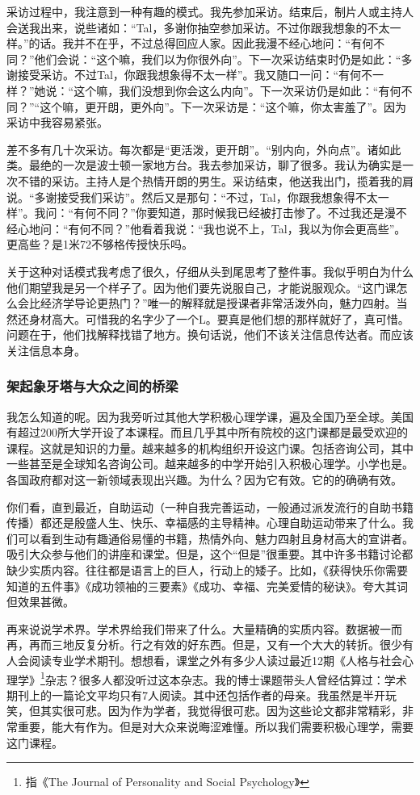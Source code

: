 采访过程中，我注意到一种有趣的模式。我先参加采访。结束后，制片人或主持人会送我出来，说些诸如：“Tal，多谢你抽空参加采访。不过你跟我想象的不太一样。”的话。我并不在乎，不过总得回应人家。因此我漫不经心地问：“有何不同？”他们会说：“这个嘛，我们以为你很外向”。下一次采访结束时仍是如此：“多谢接受采访。不过Tal，你跟我想象得不太一样”。我又随口一问：“有何不一样？”她说：“这个嘛，我们没想到你会这么内向”。下一次采访仍是如此：“有何不同？”“这个嘛，更开朗，更外向”。下一次采访是：“这个嘛，你太害羞了”。因为采访中我容易紧张。

差不多有几十次采访。每次都是“更活泼，更开朗”。“别内向，外向点”。诸如此类。最绝的一次是波士顿一家地方台。我去参加采访，聊了很多。我认为确实是一次不错的采访。主持人是个热情开朗的男生。采访结束，他送我出门，揽着我的肩说。“多谢接受我们采访”。然后又是那句：“不过，Tal，你跟我想象得不太一样”。我问：“有何不同？”你要知道，那时候我已经被打击惨了。不过我还是漫不经心地问：“有何不同？”他看着我说：“我也说不上，Tal，我以为你会更高些”。更高些？是1米72不够格传授快乐吗。

关于这种对话模式我考虑了很久，仔细从头到尾思考了整件事。我似乎明白为什么他们期望我是另一个样子了。因为他们要先说服自己，才能说服观众。“这门课怎么会比经济学导论更热门？”唯一的解释就是授课者非常活泼外向，魅力四射。当然还身材高大。可惜我的名字少了一个L。要真是他们想的那样就好了，真可惜。问题在于，他们找解释找错了地方。换句话说，他们不该关注信息传达者。而应该关注信息本身。

\subsubsection{架起象牙塔与大众之间的桥梁}
我怎么知道的呢。因为我旁听过其他大学积极心理学课，遍及全国乃至全球。美国有超过200所大学开设了本课程。而且几乎其中所有院校的这门课都是最受欢迎的课程。这就是知识的力量。越来越多的机构组织开设这门课。包括咨询公司，其中一些甚至是全球知名咨询公司。越来越多的中学开始引入积极心理学。小学也是。各国政府都对这一新领域表现出兴趣。为什么？因为它有效。它的的确确有效。

你们看，直到最近，自助运动（一种自我完善运动，一般通过派发流行的自助书籍传播）都还是殷盛人生、快乐、幸福感的主导精神。心理自助运动带来了什么。我们可以看到生动有趣通俗易懂的书籍，热情外向、魅力四射且身材高大的宣讲者。吸引大众参与他们的讲座和课堂。但是，这个“但是”很重要。其中许多书籍讨论都缺少实质内容。往往都是语言上的巨人，行动上的矮子。比如，《获得快乐你需要知道的五件事》《成功领袖的三要素》《成功、幸福、完美爱情的秘诀》。夸大其词但效果甚微。

再来说说学术界。学术界给我们带来了什么。大量精确的实质内容。数据被一而再，再而三地反复分析。行之有效的好东西。但是，又有一个大大的转折。很少有人会阅读专业学术期刊。想想看，课堂之外有多少人读过最近12期《人格与社会心理学》\footnote{指《The Journal of Personality and Social Psychology》}杂志？很多人都没听过这本杂志。我的博士课题带头人曾经估算过：学术期刊上的一篇论文平均只有7人阅读。其中还包括作者的母亲。我虽然是半开玩笑，但其实很可悲。因为作为学者，我觉得很可悲。因为这些论文都非常精彩，非常重要，能大有作为。但是对大众来说晦涩难懂。所以我们需要积极心理学，需要这门课程。

